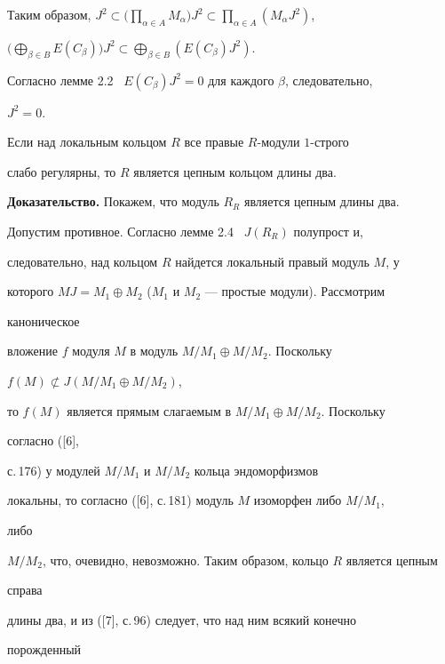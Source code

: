 Таким образом, $J^2\subset\Big( \prod\limits_{\alpha\in A} 


M_\alpha\Big)J^2\subset \prod\limits_{\alpha\in A}(M_\alpha J^2)$, 


$\Big(\bigoplus\limits_{\beta\in B} E(C_\beta)\Big)J^2\subset 


\bigoplus\limits_{\beta\in B} (E(C_\beta)J^2)$. 


Согласно лемме 2.2 \ $E(C_\beta)J^2=0$ для каждого $\beta$, следовательно, 


$J^2=0$.  


 


\begin{lems} 


Если над локальным кольцом $R$ все правые $R$-модули $1$-строго  


слабо регулярны, то $R$ является цепным кольцом длины два. 


\end{lems} 


 


{\bf Доказательство.} Покажем, что модуль $R_R$ является цепным длины два.  


Допустим противное. Согласно лемме 2.4 \ $J(R_R)$ полупрост и,  


следовательно, над кольцом $R$ найдется локальный правый модуль $M$, у 


которого $MJ=M_1\oplus M_2$ ($M_1$ и $M_2$ --- простые модули). Рассмотрим 


каноническое  


вложение $f$ модуля $M$ в модуль $M/M_1\oplus M/M_2$. Поскольку 


$f(M)\not\subset J(M/M_1\oplus M/M_2)$, 


то $f(M)$ является прямым слагаемым в $M/M_1\oplus M/M_2$. Поскольку 


согласно ([6], 


с.\,176) у модулей $M/M_1$ и $M/M_2$ кольца эндоморфизмов 


локальны, то согласно ([6], с.\,181) модуль $M$ изоморфен либо $M/M_1$, 


либо  


$M/M_2$, что, очевидно, невозможно. Таким образом, кольцо $R$ является цепным 


справа  


длины два, и из ([7], с.\,96) следует, что над ним всякий конечно 


порожденный  


